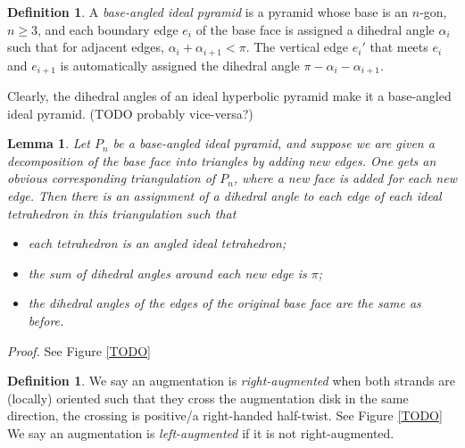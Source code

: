 \documentclass[11pt]{amsart}
\theoremstyle{plain}
\newtheorem{lemma}[theorem]{Lemma}
\theoremstyle{definition}
\newtheorem{define}[theorem]{Definition}
\begin{document}
\begin{define}
A \emph{base-angled ideal pyramid}
is a pyramid whose base is an $n$-gon, $n \geq 3$,
and each boundary edge $e_i$ of the base face is assigned a dihedral angle $\alpha_i$
such that for adjacent edges, $\alpha_i + \alpha_{i+1} < \pi$.
The vertical edge $e_i'$ that meets $e_i$ and $e_{i+1}$
is automatically assigned the dihedral angle $\pi - \alpha_i - \alpha_{i+1}$.
\end{define}

Clearly, the dihedral angles of an ideal hyperbolic pyramid
make it a base-angled ideal pyramid.
(TODO probably vice-versa?)

\begin{lemma}
Let $P_n$ be a base-angled ideal pyramid,
and suppose we are given a decomposition of the base face into triangles by adding new edges. 
One gets an obvious corresponding triangulation of $P_n$, where a new face is added for each new edge. Then there is an assignment of a dihedral angle to each edge of each ideal tetrahedron in this triangulation such that
\begin{itemize}
\item each tetrahedron is an angled ideal tetrahedron;
\item the sum of dihedral angles around each new edge is $\pi$;
\item the dihedral angles of the edges of the original base face are the same as before.
\end{itemize} 
\end{lemma}

{\it Proof.} See Figure \ref{TODO}

\begin{define}
We say an augmentation is \emph{right-augmented} when both strands are (locally) oriented such that they cross the augmentation disk in the same direction, the crossing is positive/a right-handed half-twist. See Figure \ref{TODO}
We say an augmentation is \emph{left-augmented} if it is not right-augmented.
\end{define}
\end{document}
